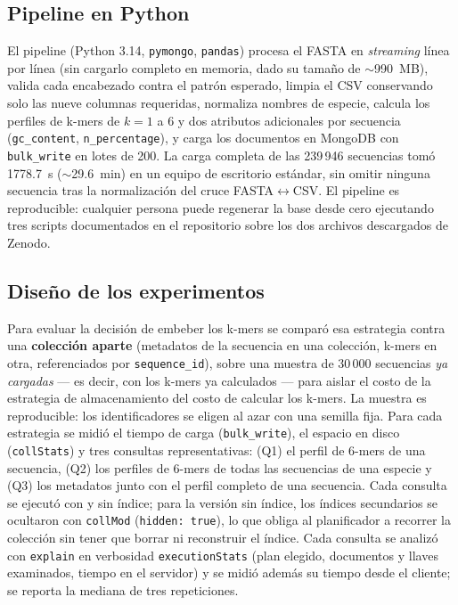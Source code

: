 \documentclass[pdflatex,sn-vancouver-num,lineno,referee]{sn-jnl}
\begin{document}
\subsection{Pipeline en Python}

El pipeline (Python 3.14, \texttt{pymongo},
\texttt{pandas}) procesa el FASTA en \emph{streaming} línea por línea (sin
cargarlo completo en memoria, dado su tamaño de $\sim$990~MB), valida cada
encabezado contra el patrón esperado, limpia el CSV conservando solo las nueve
columnas requeridas, normaliza nombres de especie, calcula los perfiles de
k-mers de $k=1$ a $6$ y dos atributos adicionales por secuencia
(\texttt{gc\_content}, \texttt{n\_percentage}), y carga los documentos en
MongoDB con \texttt{bulk\_write} en lotes de 200. La carga completa de las
239\,946 secuencias tomó 1778.7~s ($\sim$29.6~min) en un equipo de escritorio
estándar, sin omitir ninguna secuencia tras la normalización del cruce
FASTA$\leftrightarrow$CSV. El pipeline es reproducible: cualquier persona
puede regenerar la base desde cero ejecutando tres scripts documentados en el
repositorio sobre los dos archivos descargados de Zenodo.

\subsection{Diseño de los experimentos}\label{sec:experimentos}

Para evaluar la decisión de embeber los k-mers se comparó esa estrategia
contra una \textbf{colección aparte} (metadatos de la secuencia en una
colección, k-mers en otra, referenciados por \texttt{sequence\_id}), sobre una
muestra de 30\,000 secuencias \emph{ya cargadas} --- es decir, con los k-mers
ya calculados --- para aislar el costo de la estrategia de almacenamiento del
costo de calcular los k-mers. La muestra es reproducible: los identificadores
se eligen al azar con una semilla fija. Para cada estrategia se midió el
tiempo de carga (\texttt{bulk\_write}), el espacio en disco
(\texttt{collStats}) y tres consultas representativas: (Q1) el perfil de
6-mers de una secuencia, (Q2) los perfiles de 6-mers de todas las secuencias
de una especie y (Q3) los metadatos junto con el perfil completo de una
secuencia. Cada consulta se ejecutó con y sin índice; para la versión sin
índice, los índices secundarios se ocultaron con \texttt{collMod}
(\texttt{hidden:\,true}), lo que obliga al planificador a recorrer la
colección sin tener que borrar ni reconstruir el índice. Cada consulta se
analizó con \texttt{explain} en verbosidad \texttt{executionStats} (plan
elegido, documentos y llaves examinados, tiempo en el servidor) y se midió
además su tiempo desde el cliente; se reporta la mediana de tres
repeticiones.
\end{document}
